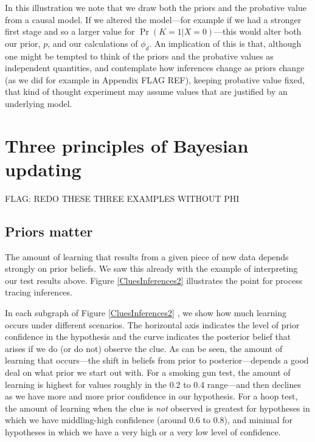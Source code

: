 \documentclass[12pt,]{book}
\begin{document}
In this illustration we note that we draw both the priors and the probative value from a causal model. If we altered the model---for example if we had a stronger first stage and so a larger value for \(\Pr(K=1|X=0)\)---this would alter both our prior, \(p\), and our calculations of \(\phi_d\). An implication of this is that, although one might be tempted to think of the priors and the probative values as independent quantities, and contemplate how inferences change as priors change (as we did for example in Appendix FLAG REF), keeping probative value fixed, that kind of thought experiment may assume values that are justified by an underlying model.

\hypertarget{three-principles-of-bayesian-updating}{%
\section{Three principles of Bayesian updating}\label{three-principles-of-bayesian-updating}}

FLAG: REDO THESE THREE EXAMPLES WITHOUT PHI

\hypertarget{AppPriors}{%
\subsection{Priors matter}\label{AppPriors}}

The amount of learning that results from a given piece of new data depends strongly on prior beliefs. We saw this already with the example of interpreting our test results above. Figure \ref{CluesInferences2} illustrates the point for process tracing inferences.

In each subgraph of Figure \ref{CluesInferences2} , we show how much learning occurs under different scenarios. The horizontal axis indicates the level of prior confidence in the hypothesis and the curve indicates the posterior belief that arises if we do (or do not) observe the clue. As can be seen, the amount of learning that occurs---the shift in beliefs from prior to posterior---depends a good deal on what prior we start out with. For a smoking gun test, the amount of learning is highest for values roughly in the 0.2 to 0.4 range---and then declines as we have more and more prior confidence in our hypothesis. For a hoop test, the amount of learning when the clue is \emph{not} observed is greatest for hypotheses in which we have middling-high confidence (around 0.6 to 0.8), and minimal for hypotheses in which we have a very high or a very low level of confidence.
\end{document}
